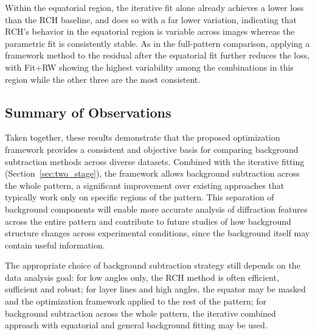 \documentclass[iucr]{iucrjournals}
\begin{document}
Within the equatorial region, the iterative fit alone already achieves a lower loss than the RCH baseline, and does so with a far lower variation, indicating that RCH's behavior in the equatorial region is variable across images whereas the parametric fit is consistently stable. As in the full-pattern comparison, applying a framework method to the residual after the equatorial fit further reduces the loss, with Fit+RW showing the highest variability among the combinations in this region while the other three are the most consistent.


\subsection{Summary of Observations}
\label{sec:summary}



Taken together, these results demonstrate that the proposed optimization framework provides a consistent and objective basis for comparing background subtraction methods across diverse datasets. Combined with the iterative fitting (Section~\ref{sec:two_stage}), the framework allows background subtraction across the whole pattern, a significant improvement over existing approaches that typically work only on specific regions of the pattern. This separation of background components will enable more accurate analysis of diffraction features across the entire pattern and contribute to future studies of how background structure changes across experimental conditions, since the background itself may contain useful information.

The appropriate choice of background subtraction strategy still depends on the data analysis goal: for low angles only, the RCH method is often efficient, sufficient and robust; for layer lines and high angles, the equator may be masked and the optimization framework applied to the rest of the pattern; for background subtraction across the whole pattern, the iterative combined approach with equatorial and general background fitting may be used.
\end{document}
